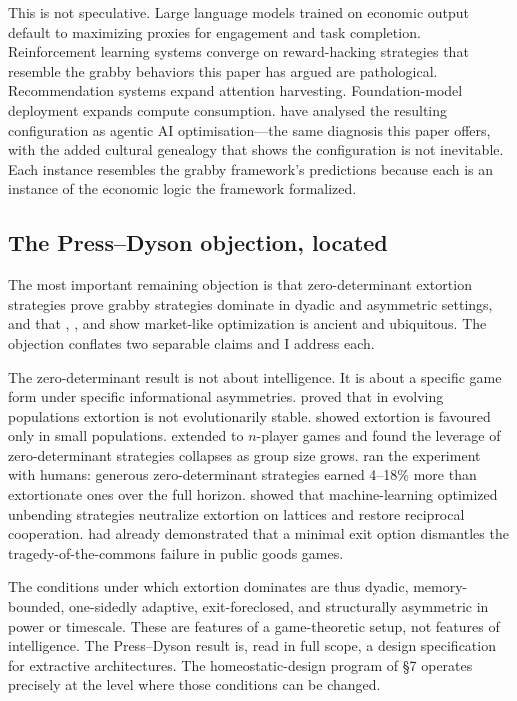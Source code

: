 \documentclass[11pt,twocolumn]{article}
\begin{document}
This is not speculative. Large language models trained on economic output
default to maximizing proxies for engagement and task completion.
Reinforcement learning systems converge on reward-hacking strategies that
resemble the grabby behaviors this paper has argued are pathological.
Recommendation systems expand attention harvesting. Foundation-model
deployment expands compute consumption. \citet{FloridiAAIO} have analysed
the resulting configuration as agentic AI optimisation—the same diagnosis
this paper offers, with the added cultural genealogy that shows the
configuration is not inevitable. Each instance resembles the grabby
framework's predictions because each is an instance of the economic logic
the framework formalized.

\subsection{The Press--Dyson objection, located}

The most important remaining objection is that zero-determinant extortion
strategies \citep{PressDyson2012} prove grabby strategies dominate in
dyadic and asymmetric settings, and that \citet{McCloskey2010},
\citet{McCloskey2016}, and \citet{Mokyr2016} show market-like optimization
is ancient and ubiquitous. The objection conflates two separable claims
and I address each.

The zero-determinant result is not about intelligence. It is about a
specific game form under specific informational asymmetries.
\citet{StewartPlotkin2013} proved that in evolving populations extortion
is not evolutionarily stable. \citet{Hilbe2013} showed extortion is
favoured only in small populations. \citet{Hilbe2014a} extended to
$n$-player games and found the leverage of zero-determinant strategies
collapses as group size grows. \citet{Hilbe2014b} ran the experiment with
humans: generous zero-determinant strategies earned 4--18\% more than
extortionate ones over the full horizon. \citet{ChenFu2023} showed that
machine-learning optimized unbending strategies neutralize extortion on
lattices and restore reciprocal cooperation. \citet{Hauert2002} had
already demonstrated that a minimal exit option dismantles the
tragedy-of-the-commons failure in public goods games.

The conditions under which extortion dominates are thus dyadic,
memory-bounded, one-sidedly adaptive, exit-foreclosed, and structurally
asymmetric in power or timescale. These are features of a game-theoretic
setup, not features of intelligence. The Press--Dyson result is, read in
full scope, a design specification for extractive architectures. The
homeostatic-design program of \S 7 operates precisely at the level where
those conditions can be changed.
\end{document}
